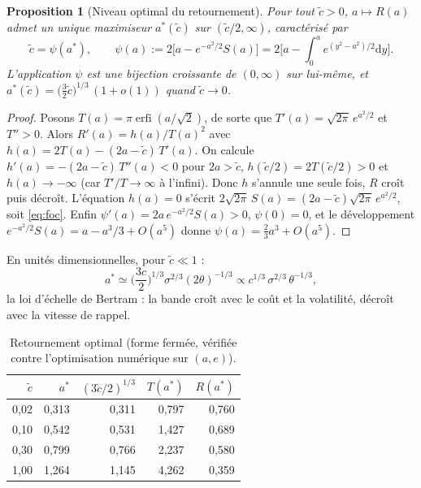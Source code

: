 \documentclass[11pt,a4paper]{article}
\newtheorem{proposition}{Proposition}
\theoremstyle{definition}
\theoremstyle{remark}
\newcommand{\dd}{\mathrm{d}}
\DeclareMathOperator{\erfi}{erfi}
\begin{document}
\begin{proposition}[Niveau optimal du retournement]\label{p:opt}
Pour tout $\tilde c>0$, $a\mapsto R(a)$ admet un unique maximiseur $a^*(\tilde c)$ sur $(\tilde c/2,\infty)$, caractérisé par
\begin{equation}\label{eq:foc}
\tilde c=\psi(a^*),\qquad \psi(a):=2\Big[a-e^{-a^2/2}S(a)\Big]=2\Big[a-\int_0^a e^{(y^2-a^2)/2}\dd y\Big].
\end{equation}
L'application $\psi$ est une bijection croissante de $(0,\infty)$ sur lui-même, et
$a^*(\tilde c)=\big(\tfrac32\tilde c\big)^{1/3}\,(1+o(1))$ quand $\tilde c\to0$.
\end{proposition}
\begin{proof}
Posons $T(a)=\pi\erfi(a/\sqrt2)$, de sorte que $T'(a)=\sqrt{2\pi}\,e^{a^2/2}$ et $T''>0$.
Alors $R'(a)=h(a)/T(a)^2$ avec $h(a)=2T(a)-(2a-\tilde c)\,T'(a)$. On calcule
$h'(a)=-(2a-\tilde c)\,T''(a)<0$ pour $2a>\tilde c$, $h(\tilde c/2)=2T(\tilde c/2)>0$ et $h(a)\to-\infty$
(car $T'/T\to\infty$ à l'infini). Donc $h$ s'annule une seule fois, $R$ croît puis décroît.
L'équation $h(a)=0$ s'écrit $2\sqrt{2\pi}\,S(a)=(2a-\tilde c)\sqrt{2\pi}\,e^{a^2/2}$, soit \eqref{eq:foc}.
Enfin $\psi'(a)=2a\,e^{-a^2/2}S(a)>0$, $\psi(0)=0$, et le développement
$e^{-a^2/2}S(a)=a-a^3/3+O(a^5)$ donne $\psi(a)=\tfrac23a^3+O(a^5)$.
\end{proof}

En unités dimensionnelles, pour $\tilde c\ll1$ :
\begin{equation}\label{eq:scaling}
a^*\simeq\Big(\frac{3c}{2}\Big)^{1/3}\sigma^{2/3}(2\theta)^{-1/3}\propto c^{1/3}\,\sigma^{2/3}\,\theta^{-1/3},
\end{equation}
la loi d'échelle de Bertram : la bande croît avec le coût et la volatilité, décroît avec la vitesse de rappel.

\begin{table}[h]
\centering
\caption{Retournement optimal (forme fermée, vérifiée contre l'optimisation numérique sur $(a,e)$).}
\begin{tabular}{rrrrr}
\toprule
$\tilde c$ & $a^*$ & $(3\tilde c/2)^{1/3}$ & $T(a^*)$ & $R(a^*)$\\
\midrule
0{,}02 & 0{,}313 & 0{,}311 & 0{,}797 & 0{,}760\\
0{,}10 & 0{,}542 & 0{,}531 & 1{,}427 & 0{,}689\\
0{,}30 & 0{,}799 & 0{,}766 & 2{,}237 & 0{,}580\\
1{,}00 & 1{,}264 & 1{,}145 & 4{,}262 & 0{,}359\\
\bottomrule
\end{tabular}
\end{table}
\end{document}
